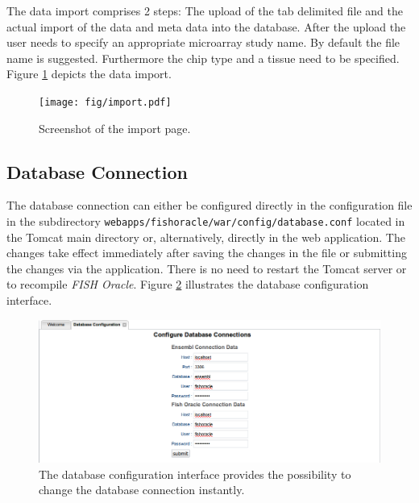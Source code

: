 \documentclass[11pt,final]{article}
\newcommand{\FO}[0]{\emph{FISH Oracle}\xspace}
\begin{document}
The data import comprises 2 steps: The upload of the tab delimited file and
the actual import of the data and meta data into the database.
After the upload the user needs to specify an appropriate microarray study
name. By default the file name is suggested. Furthermore the chip type and a
tissue need to be specified. Figure \ref{fig:import} depicts the data import.

\begin{figure}[h]
	\begin{center}
	  \texttt{[image: fig/import.pdf]}
	\end{center}
	\caption{Screenshot of the import page.}
	\label{fig:import}
\end{figure}


\subsection{Database Connection}

The database connection can either be configured directly in the configuration
file in the subdirectory \texttt{webapps/fishoracle/war/config/database.conf}
located in the Tomcat main directory or, alternatively, directly in the web
application.
The changes take effect immediately after saving the changes in the file or
submitting the changes via the application. There is no need to restart the
Tomcat server or to recompile \FO. Figure \ref{fig:dbconfig}
illustrates the database configuration interface.

\begin{figure}[h]
	\begin{center}
		\includegraphics[width=\textwidth]{fig/dbconfig.png}
	\end{center}
	\caption{The database configuration interface provides the possibility
	         to change the database connection instantly.}
	\label{fig:dbconfig}
\end{figure}
\end{document}
